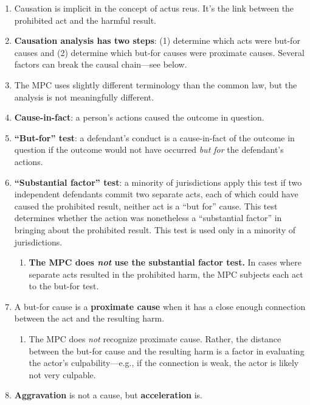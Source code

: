 \begin{enumerate}
    \item Causation is implicit in the concept of actus reus. It's the link 
    between the prohibited act and the harmful result.
    \item \textbf{Causation analysis has two steps}: (1) determine which acts were 
    but-for causes and (2) determine which but-for causes were proximate 
    causes. Several factors can break the causal chain---see below.
    \item The MPC uses slightly different terminology than the common law, but 
    the analysis is not meaningfully different.
    \item \textbf{Cause-in-fact}: a person's actions caused the outcome in 
    question.
    \item \textbf{``But-for'' test}: a defendant's conduct is a cause-in-fact 
    of the outcome in question if the outcome would not have occurred 
    \emph{but for} the defendant's actions.
    \item \textbf{``Substantial factor'' test}: a minority of jurisdictions 
    apply this test if two independent defendants commit two separate acts, 
    each of which could have caused the prohibited result, neither act is a 
    ``but for'' cause. This test determines whether the action was nonetheless 
    a ``substantial factor'' in bringing about the prohibited result. This 
    test is used only in a minority of jurisdictions.
    \begin{enumerate}
        \item \textbf{The MPC does \emph{not} use the substantial factor 
        test.} In cases where separate acts resulted in the prohibited harm, 
        the MPC subjects each act to the but-for test.
    \end{enumerate}
    \item A but-for cause is a \textbf{proximate cause} when it has a close 
    enough connection between the act and the resulting harm.
    \begin{enumerate}
        \item The MPC does \emph{not} recognize proximate cause. Rather, the 
        distance between the but-for cause and the resulting harm is a factor 
        in evaluating the actor's culpability---e.g., if the connection is 
        weak, the actor is likely not very culpable.
    \end{enumerate}
    \item \textbf{Aggravation} is not a cause, but \textbf{acceleration} is. 

\end{enumerate}
